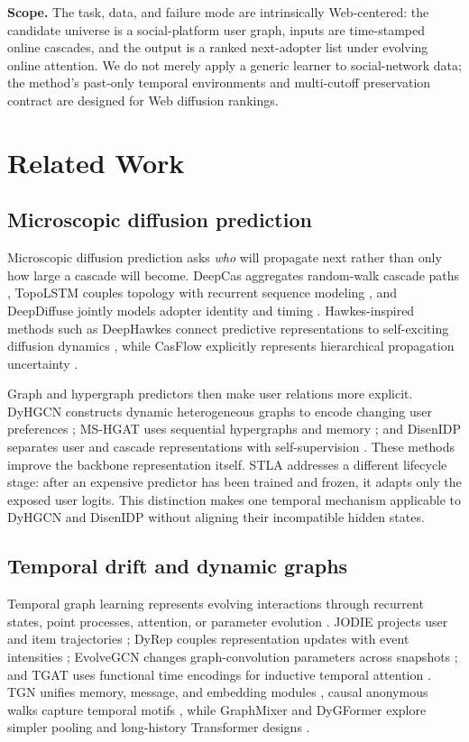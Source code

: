 \documentclass[sigconf,anonymous,review]{acmart}
\newcommand{\method}{\textsc{STLA}\xspace}
\begin{document}
\noindent\textbf{Scope.} The task, data, and failure mode are intrinsically Web-centered: the candidate universe is a social-platform user graph, inputs are time-stamped online cascades, and the output is a ranked next-adopter list under evolving online attention. We do not merely apply a generic learner to social-network data; the method's past-only temporal environments and multi-cutoff preservation contract are designed for Web diffusion rankings.

\section{Related Work}
\subsection{Microscopic diffusion prediction}
Microscopic diffusion prediction asks \emph{who} will propagate next rather than only how large a cascade will become. DeepCas aggregates random-walk cascade paths \cite{li2017deepcas}, TopoLSTM couples topology with recurrent sequence modeling \cite{wang2017topolstm}, and DeepDiffuse jointly models adopter identity and timing \cite{islam2018deepdiffuse}. Hawkes-inspired methods such as DeepHawkes connect predictive representations to self-exciting diffusion dynamics \cite{cao2017deephawkes}, while CasFlow explicitly represents hierarchical propagation uncertainty \cite{xu2023casflow}.

Graph and hypergraph predictors then make user relations more explicit. DyHGCN constructs dynamic heterogeneous graphs to encode changing user preferences \cite{yuan2020dyhgcn}; MS-HGAT uses sequential hypergraphs and memory \cite{sun2022mshgat}; and DisenIDP separates user and cascade representations with self-supervision \cite{cheng2023disenidp}. These methods improve the backbone representation itself. \method addresses a different lifecycle stage: after an expensive predictor has been trained and frozen, it adapts only the exposed user logits. This distinction makes one temporal mechanism applicable to DyHGCN and DisenIDP without aligning their incompatible hidden states.

\subsection{Temporal drift and dynamic graphs}
Temporal graph learning represents evolving interactions through recurrent states, point processes, attention, or parameter evolution \cite{kazemi2020dynamic}. JODIE projects user and item trajectories \cite{kumar2019jodie}; DyRep couples representation updates with event intensities \cite{trivedi2019dyrep}; EvolveGCN changes graph-convolution parameters across snapshots \cite{pareja2020evolvegcn}; and TGAT uses functional time encodings for inductive temporal attention \cite{xu2020tgat}. TGN unifies memory, message, and embedding modules \cite{rossi2020tgn}, causal anonymous walks capture temporal motifs \cite{wang2021caw}, while GraphMixer and DyGFormer explore simpler pooling and long-history Transformer designs \cite{cong2023graphmixer,yu2023dygformer}.
\end{document}
